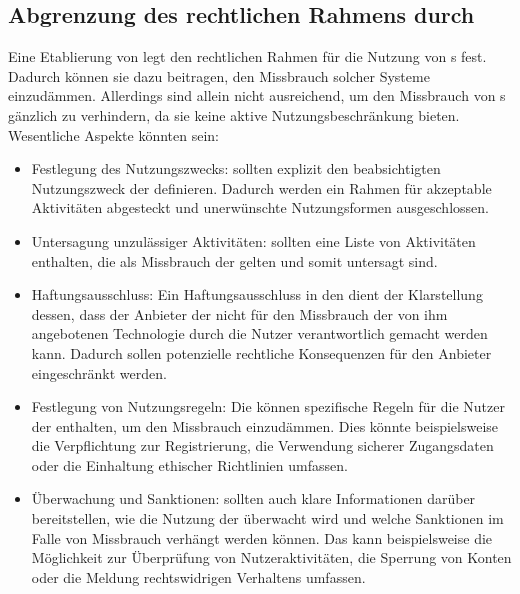 \documentclass[hidelinks,12pt]{report}
\begin{document}
\subsection{Abgrenzung des rechtlichen Rahmens durch }
Eine Etablierung von  legt den rechtlichen Rahmen für die Nutzung von s fest. Dadurch können sie dazu beitragen, den Missbrauch solcher Systeme einzudämmen. Allerdings sind  allein nicht ausreichend, um den Missbrauch von s gänzlich zu verhindern, da sie keine aktive Nutzungsbeschränkung bieten. Wesentliche Aspekte könnten sein:\\

\begin{itemize}
	\item Festlegung des Nutzungszwecks:  sollten explizit den beabsichtigten Nutzungszweck der  definieren. Dadurch werden ein Rahmen für akzeptable Aktivitäten abgesteckt und unerwünschte Nutzungsformen ausgeschlossen.
	\item Untersagung unzulässiger Aktivitäten:  sollten eine Liste von Aktivitäten enthalten, die als Missbrauch der  gelten und somit untersagt sind.
	\item Haftungsausschluss: Ein Haftungsausschluss in den  dient der Klarstellung dessen, dass der Anbieter der  nicht für den Missbrauch der von ihm angebotenen Technologie durch die Nutzer verantwortlich gemacht werden kann. Dadurch sollen potenzielle rechtliche Konsequenzen für den Anbieter eingeschränkt werden.
	\item Festlegung von Nutzungsregeln: Die   können spezifische Regeln für die Nutzer der  enthalten, um den Missbrauch einzudämmen. Dies könnte beispielsweise die Verpflichtung zur Registrierung, die Verwendung sicherer Zugangsdaten oder die Einhaltung ethischer Richtlinien umfassen.
	\item Überwachung und Sanktionen:  sollten auch klare Informationen darüber bereitstellen, wie die Nutzung der  überwacht wird und welche Sanktionen im Falle von Missbrauch verhängt werden können. Das kann beispielsweise die Möglichkeit zur Überprüfung von Nutzeraktivitäten, die Sperrung von Konten oder die Meldung rechtswidrigen Verhaltens umfassen.
\end{itemize}

\newpage
\end{document}
